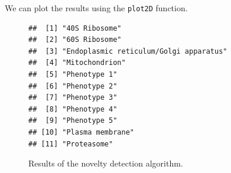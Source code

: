 We can plot the results using the \texttt{plot2D} function.

\begin{figure}[!ht]
  \centering
\begin{knitrout}
\color{fgcolor}\begin{kframe}
\begin{alltt}
 \hlkwb{<-}  \hlstd{)}
\end{alltt}
\begin{verbatim}
##  [1] "40S Ribosome"                         
##  [2] "60S Ribosome"                         
##  [3] "Endoplasmic reticulum/Golgi apparatus"
##  [4] "Mitochondrion"                        
##  [5] "Phenotype 1"                          
##  [6] "Phenotype 2"                          
##  [7] "Phenotype 3"                          
##  [8] "Phenotype 4"                          
##  [9] "Phenotype 5"                          
## [10] "Plasma membrane"                      
## [11] "Proteasome"
\end{verbatim}
\begin{alltt}
 \hlkwb{<-} \hlstd{()[}\hlstd{(cl)]}
 \hlkwb{<-} \hlstd{(}  \hlstd{=} \hlstd{)}
 \hlkwb{<-} \hlstd{()[}\hlstd{(cl)][}\hlopt{:}\hlstd{(ind)]}
\hlstd{cols[}\hlopt{-}\hlstd{ind]} \hlkwb{<-} \hlstd{()[}\hlstd{(cl)][(} \hlopt{+} \hlstd{)}\hlopt{:}\hlstd{(cl)]}

\hlstd{(} \hlstd{=} \hlstd{(}\hlstd{,} \hlstd{))}
  \hlstd{=} \hlstd{,}
        \hlstd{=} \hlstd{,}  \hlstd{=} \hlstd{()[}\hlopt{:}\hlstd{])}
  \hlstd{=} \hlstd{,}  \hlstd{=} \hlstd{)}
  \hlstd{=} \hlstd{,}  \hlstd{=} \hlstd{,}  
  \hlstd{=} \hlstd{,}  \hlstd{=} \hlstd{,}  
\end{alltt}
\end{kframe}
\end{knitrout}
  \caption{Results of the novelty detection algorithm.}
  \label{fig:plotPDres}
\end{figure}


